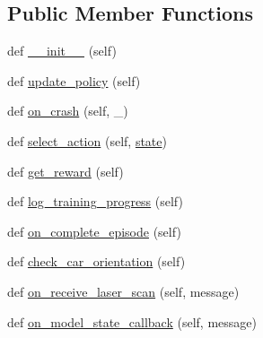 \subsection*{Public Member Functions}
\begin{DoxyCompactItemize}
\item 
def \hyperlink{classpolicy_gradient_1_1_q_learning_training_node_a4f2955979cf29f0ab46a4ce9c1d3b378}{\+\_\+\+\_\+init\+\_\+\+\_\+} (self)
\item 
def \hyperlink{classpolicy_gradient_1_1_q_learning_training_node_ac7a7dabb75bc2280105b2455c2e83e9b}{update\+\_\+policy} (self)
\item 
def \hyperlink{classpolicy_gradient_1_1_q_learning_training_node_af2b0cdb88411dca8c9ec14183ec259c9}{on\+\_\+crash} (self, \+\_\+)
\item 
def \hyperlink{classpolicy_gradient_1_1_q_learning_training_node_a2cb4abb99ae5da35e364b0e64ae81216}{select\+\_\+action} (self, \hyperlink{classpolicy_gradient_1_1_q_learning_training_node_ade80819acefe831706a4f02c100d672e}{state})
\item 
def \hyperlink{classpolicy_gradient_1_1_q_learning_training_node_a238d31641b80d46517d6402a3158ba5d}{get\+\_\+reward} (self)
\item 
def \hyperlink{classpolicy_gradient_1_1_q_learning_training_node_a55654150b7d3244e54e7f082fb222abd}{log\+\_\+training\+\_\+progress} (self)
\item 
def \hyperlink{classpolicy_gradient_1_1_q_learning_training_node_a724a4c55e483f87fcdcd0bdb311bb1f1}{on\+\_\+complete\+\_\+episode} (self)
\item 
def \hyperlink{classpolicy_gradient_1_1_q_learning_training_node_a432e2998eccb75bfb30c850080353dc4}{check\+\_\+car\+\_\+orientation} (self)
\item 
def \hyperlink{classpolicy_gradient_1_1_q_learning_training_node_aa343056c30d72873a85c3b9d8d3ae6fd}{on\+\_\+receive\+\_\+laser\+\_\+scan} (self, message)
\item 
def \hyperlink{classpolicy_gradient_1_1_q_learning_training_node_af52652b3ec33b967b437e4a49e6339dd}{on\+\_\+model\+\_\+state\+\_\+callback} (self, message)
\end{DoxyCompactItemize}
